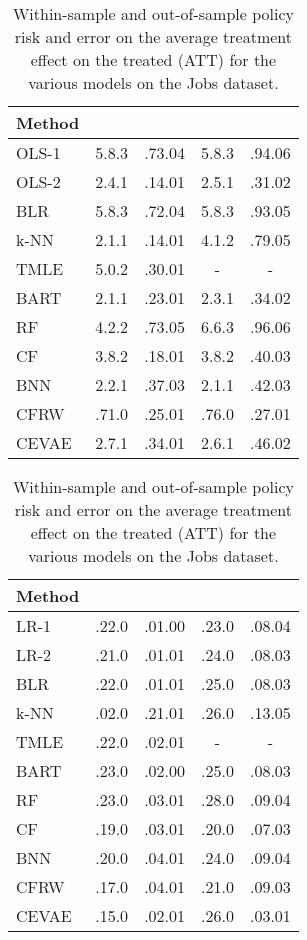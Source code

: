 \documentclass{article}
\begin{document}
\begin{table}[htb!]
\begin{minipage}{.51\linewidth}
\centering
\caption{Within-sample and out-of-sample mean and standard errors for the metrics for the various models at the IHDP dataset.}\label{tab:ihdp}
\begin{adjustbox}{max width=\linewidth}
\begin{tabular}{lcccc}
\toprule
Method &  &  &   &  \\\midrule
OLS-1 & 5.8.3 & .73.04 & 5.8.3 & .94.06\\
OLS-2 & 2.4.1 & .14.01 & 2.5.1 & .31.02\\
BLR & 5.8.3 & .72.04 & 5.8.3 & .93.05 \\
k-NN & 2.1.1 & .14.01 & 4.1.2 & .79.05\\
TMLE & 5.0.2 & .30.01 & - & - \\
BART & 2.1.1 & .23.01 & 2.3.1 & .34.02 \\
RF & 4.2.2 & .73.05 & 6.6.3 & .96.06 \\
CF & 3.8.2 & .18.01 & 3.8.2 & .40.03 \\
BNN & 2.2.1 & .37.03 & 2.1.1 & .42.03 \\
CFRW & .71.0 & .25.01 & .76.0 & .27.01\\\midrule
CEVAE & 2.7.1 & .34.01& 2.6.1 & .46.02\\
\bottomrule
\end{tabular}\end{adjustbox}
\end{minipage}\hfill
\begin{minipage}{.45\linewidth}
\centering
\caption{Within-sample and out-of-sample policy risk and error on the average
treatment effect on the treated (ATT) for the various models on the Jobs dataset.}\label{tab:jobs}
\begin{adjustbox}{max width=\linewidth}
\begin{tabular}{lcccc}
\toprule
Method &  &  &  & \\\midrule
LR-1 & .22.0 & .01.00 & .23.0 & .08.04\\
LR-2 & .21.0 & .01.01 & .24.0 & .08.03\\
BLR & .22.0 & .01.01 & .25.0 & .08.03 \\
k-NN & .02.0 & .21.01 & .26.0 & .13.05\\
TMLE & .22.0 & .02.01 & - & - \\
BART & .23.0 & .02.00 & .25.0 & .08.03 \\
RF & .23.0 & .03.01 & .28.0 & .09.04 \\
CF & .19.0 & .03.01 & .20.0 & .07.03 \\
BNN & .20.0 & .04.01 & .24.0 & .09.04 \\
CFRW &.17.0 & .04.01 & .21.0 & .09.03\\\midrule
CEVAE & .15.0 & .02.01 & .26.0 & .03.01\\
\bottomrule
\end{tabular}\end{adjustbox}
\end{minipage}
\end{table}
\end{document}
